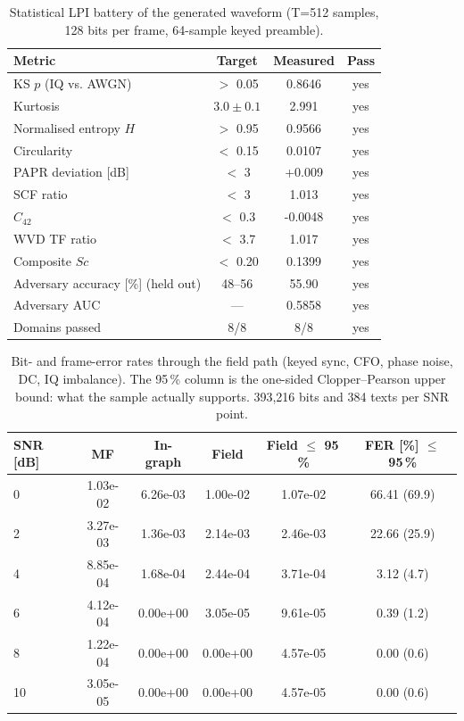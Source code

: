 
\begin{table}[t]
\centering
\caption{Statistical LPI battery of the generated waveform (T=512 samples, 128 bits per frame, 64-sample keyed preamble).}
\label{tab:lpi-stealth}
\begin{tabular}{@{}lccc@{}}
\hline
Metric & Target & Measured & Pass \\
\hline
KS $p$ (IQ vs. AWGN) & $>$ 0.05 & 0.8646 & yes \\
Kurtosis & $3.0\pm0.1$ & 2.991 & yes \\
Normalised entropy $H$ & $>$ 0.95 & 0.9566 & yes \\
Circularity & $<$ 0.15 & 0.0107 & yes \\
PAPR deviation [dB] & $<$ 3 & +0.009 & yes \\
SCF ratio & $<$ 3 & 1.013 & yes \\
$C_{42}$ & $<$ 0.3 & -0.0048 & yes \\
WVD TF ratio & $<$ 3.7 & 1.017 & yes \\
Composite $Sc$ & $<$ 0.20 & 0.1399 & yes \\
Adversary accuracy [\%] (held out) & 48--56 & 55.90 & yes \\
Adversary AUC & --- & 0.5858 & yes \\
Domains passed & 8/8 & 8/8 & yes \\
\hline
\end{tabular}
\end{table}

\begin{table}[t]
\centering
\caption{Bit- and frame-error rates through the field path (keyed sync, CFO, phase noise, DC, IQ imbalance). The 95\,\% column is the one-sided Clopper--Pearson upper bound: what the sample actually supports. 393,216 bits and 384 texts per SNR point. }
\label{tab:lpi-link}
\begin{tabular}{@{}lccccc@{}}
\hline
SNR [dB] & MF & In-graph & Field & Field $\leq$ 95\,\% & FER [\%] $\leq$ 95\,\% \\
\hline
0 & 1.03e-02 & 6.26e-03 & 1.00e-02 & 1.07e-02 & 66.41 (69.9) \\
2 & 3.27e-03 & 1.36e-03 & 2.14e-03 & 2.46e-03 & 22.66 (25.9) \\
4 & 8.85e-04 & 1.68e-04 & 2.44e-04 & 3.71e-04 & 3.12 (4.7) \\
6 & 4.12e-04 & 0.00e+00 & 3.05e-05 & 9.61e-05 & 0.39 (1.2) \\
8 & 1.22e-04 & 0.00e+00 & 0.00e+00 & 4.57e-05 & 0.00 (0.6) \\
10 & 3.05e-05 & 0.00e+00 & 0.00e+00 & 4.57e-05 & 0.00 (0.6) \\
\hline
\end{tabular}
\end{table}

